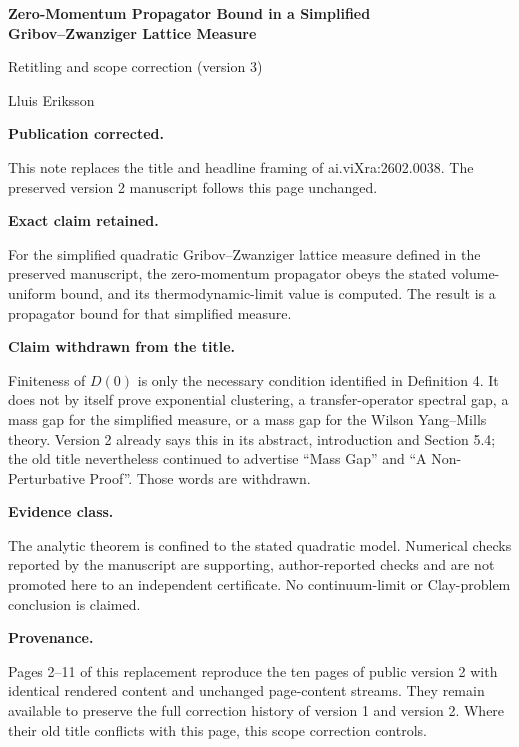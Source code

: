 \documentclass[11pt]{article}
\begin{document}
\begin{center}
{\Large\bfseries Zero-Momentum Propagator Bound in a Simplified\\
Gribov--Zwanziger Lattice Measure\par}
\vspace{0.7em}
{\large Retitling and scope correction (version 3)\par}
\vspace{0.5em}
Lluis Eriksson
\end{center}

\textbf{Publication corrected.}\par
This note replaces the title and headline framing of ai.viXra:2602.0038.  The
preserved version 2 manuscript follows this page unchanged.

\textbf{Exact claim retained.}\par
For the simplified quadratic Gribov--Zwanziger lattice measure defined in the
preserved manuscript, the zero-momentum propagator obeys the stated
volume-uniform bound, and its thermodynamic-limit value is computed.  The
result is a propagator bound for that simplified measure.

\textbf{Claim withdrawn from the title.}\par
Finiteness of $D(0)$ is only the necessary condition identified in Definition 4.
It does not by itself prove exponential clustering, a transfer-operator spectral
gap, a mass gap for the simplified measure, or a mass gap for the Wilson
Yang--Mills theory.  Version 2 already says this in its abstract, introduction
and Section 5.4; the old title nevertheless continued to advertise ``Mass Gap''
and ``A Non-Perturbative Proof''.  Those words are withdrawn.

\textbf{Evidence class.}\par
The analytic theorem is confined to the stated quadratic model.  Numerical
checks reported by the manuscript are supporting, author-reported checks and
are not promoted here to an independent certificate.  No continuum-limit or
Clay-problem conclusion is claimed.

\textbf{Provenance.}\par
Pages 2--11 of this replacement reproduce the ten pages of public version 2
with identical rendered content and unchanged page-content streams.  They remain available to preserve the
full correction history of version 1 and version 2.  Where their old title
conflicts with this page, this scope correction controls.
\end{document}
